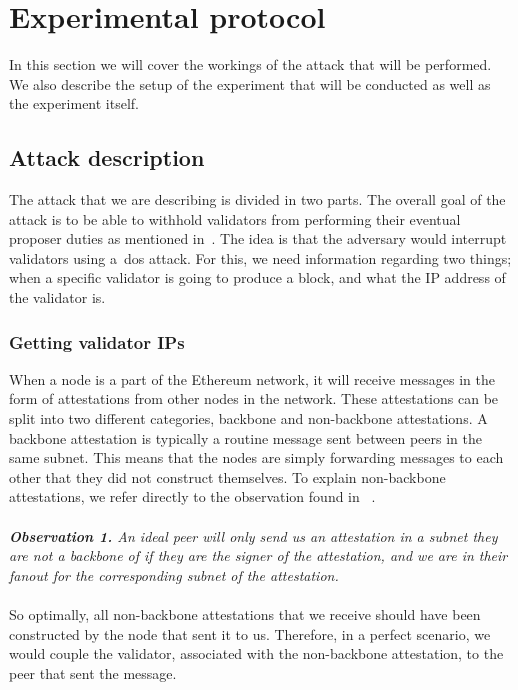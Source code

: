 

\section{Experimental protocol}\label{sec:experimental-protocol}
In this section we will cover the workings of the attack that will be performed.
We also describe the setup of the experiment that will be conducted as well as the experiment itself.

\subsection{Attack description}\label{subsec:attack-description}
The attack that we are describing is divided in two parts.
The overall goal of the attack is
to be able
to withhold validators from performing their eventual proposer duties
as mentioned in~\cite{EthereumAttackDefense2024}.
The idea is that the adversary would interrupt validators using a~\gls{dos} attack.
For this, we need information regarding two things;
when a specific validator is going to produce a block, and what the IP address of the validator is.

\subsubsection{Getting validator IPs}
When a node is a part of the Ethereum network,
it will receive messages in the form of attestations from other nodes in the network.
These attestations can be split into two different categories, backbone and non-backbone attestations.
A backbone attestation is typically a routine message sent between peers in the same subnet.
This means that the nodes are simply forwarding messages to each other that they did not construct themselves.
To explain non-backbone attestations,
we refer directly to the observation found in ~\cite{heimbach2024deanonymizingethereumvalidatorsp2p}.
\\\\
\textit{\textbf{Observation 1.} An ideal peer will only send us an attestation in a subnet they are not a backbone of
if they are the signer of the attestation,
    and we are in their fanout for the corresponding subnet of the attestation.}
\\\\

So optimally, all non-backbone attestations that we receive should have been constructed by the node that sent it to us.
Therefore, in a perfect scenario,
we would couple the validator, associated with the non-backbone attestation, to the peer that sent the message.

